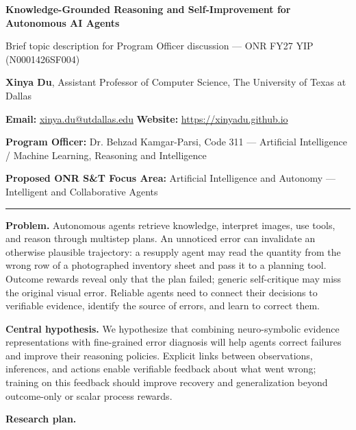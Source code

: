 \documentclass[11pt,letterpaper]{article}
\newcommand{\head}[1]{\textbf{#1}\enspace}
\newcommand{\POline}{Dr. Behzad Kamgar-Parsi, Code 311 --- Artificial Intelligence / Machine Learning, Reasoning and Intelligence}
\newcommand{\FocusArea}{Artificial Intelligence and Autonomy --- Intelligent and Collaborative Agents}
\begin{document}
\begin{center}
{\fontsize{14}{16}\selectfont\bfseries Knowledge-Grounded Reasoning and Self-Improvement for Autonomous AI Agents\par}
\vspace{2pt}
{\small Brief topic description for Program Officer discussion --- ONR FY27 YIP (N0001426SF004)}
\end{center}
\vspace{-2pt}
{\small \textbf{Xinya Du}, Assistant Professor of Computer Science, The University of Texas at Dallas\par
\textbf{Email:} \href{mailto:xinya.du@utdallas.edu}{xinya.du@utdallas.edu} \quad \textbf{Website:} \href{https://xinyadu.github.io}{https://xinyadu.github.io}\par
\textbf{Program Officer:} \POline\par
\textbf{Proposed ONR S\&T Focus Area:} \FocusArea\par}
\vspace{2pt}\hrule\vspace{5pt}
\head{Problem.} Autonomous agents retrieve knowledge, interpret images, use tools, and reason through multistep plans. An unnoticed error can invalidate an otherwise plausible trajectory: a resupply agent may read the quantity from the wrong row of a photographed inventory sheet and pass it to a planning tool. Outcome rewards reveal only that the plan failed; generic self-critique may miss the original visual error. Reliable agents need to connect their decisions to verifiable evidence, identify the source of errors, and learn to correct them.
\par\head{Central hypothesis.} We hypothesize that combining neuro-symbolic evidence representations with fine-grained error diagnosis will help agents correct failures and improve their reasoning policies. Explicit links between observations, inferences, and actions enable verifiable feedback about what went wrong; training on this feedback should improve recovery and generalization beyond outcome-only or scalar process rewards.
\par\head{Research plan.}
\end{document}
